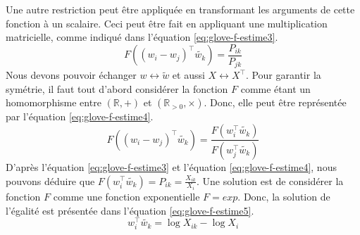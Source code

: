 \documentclass{KodeBook}
\begin{document}
Une autre restriction peut être appliquée en transformant les arguments de cette fonction à un scalaire.
Ceci peut être fait en appliquant une multiplication matricielle, comme indiqué dans l'équation \ref{eq:glove-f-estime3}.
\begin{equation}
F((w_i - w_j)^\top \tilde{w_k}) = \frac{P_{ik}}{P_{jk}}
\label{eq:glove-f-estime3}
\end{equation}
Nous devons pouvoir échanger $w \leftrightarrow \tilde{w}$ et aussi $X \leftrightarrow X^\top$. 
Pour garantir la symétrie, il faut tout d'abord considérer la fonction $F$ comme étant un homomorphisme entre $(\mathbb{R}, +)$ et $(\mathbb{R}_{>0}, \times)$.
Donc, elle peut être représentée par l'équation \ref{eq:glove-f-estime4}. 
\begin{equation}
F((w_i - w_j)^\top \tilde{w_k}) = \frac{F(w_i^\top \tilde{w_k})}{F(w_j^\top \tilde{w_k})}
\label{eq:glove-f-estime4}
\end{equation}
D'après l'équation \ref{eq:glove-f-estime3} et l'équation \ref{eq:glove-f-estime4}, nous pouvons déduire que $F(w_i^\top \tilde{w_k}) = P_{ik} = \frac{X_{ik}}{X_i}$. 
Une solution est de considérer la fonction $F$ comme une fonction exponentielle $F=exp$. 
Donc, la solution de l'égalité est présentée dans l'équation \ref{eq:glove-f-estime5}.
\begin{equation}
w_i^\top \tilde{w_k} = \log X_{ik} - \log X_i
\label{eq:glove-f-estime5}
\end{equation}
\end{document}
